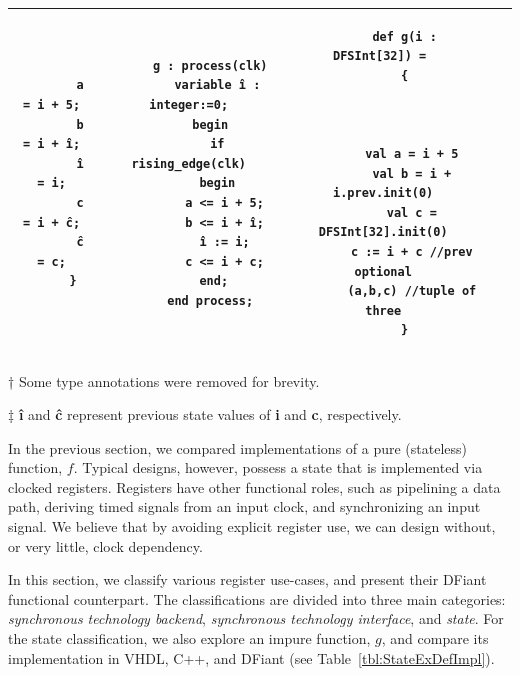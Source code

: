 \begin{table}
\begin{threeparttable}
\begin{tabular}{|c|c|c|c|c|}
\begin{minipage}[b]{0.14\linewidth}
\begin{verbatim}
        a = i + 5;
        b = i + î;
        î = i;
        c = i + ĉ;
        ĉ = c;
      }
		\end{verbatim}
	\end{minipage}
	&
	\begin{minipage}[b]{0.21\linewidth}
		\begin{verbatim}
      g : process(clk)
        variable î : integer:=0;
      begin
        if rising_edge(clk)
        begin
          a <= i + 5;
          b <= i + î;
          î := i;
          c <= i + c;
        end; 
      end process;
			\end{verbatim}
	\end{minipage}
	&
	\begin{minipage}[b]{0.23\linewidth}
		\begin{verbatim}
      def g(i : DFSInt[32]) = 
      {
        
        
        
        val a = i + 5
        val b = i + i.prev.init(0)
        val c = DFSInt[32].init(0)
        c := i + c //prev optional
        (a,b,c) //tuple of three
      }
		\end{verbatim}
	\end{minipage}
  \\
  \hline
  \end{tabular}
  \begin{tablenotes}
    \item [†] Some type annotations were removed for brevity.
    \item [‡] \textbf{î} and \textbf{ĉ} represent previous state values of \textbf{i} and \textbf{c}, respectively.
  \end{tablenotes}
  \end{threeparttable}
\end{table}%

In the previous section, we compared implementations of a pure (stateless) function, $f$. Typical designs, however, possess a state that is implemented via clocked registers. Registers have other functional roles, such as pipelining a data path, deriving timed signals from an input clock, and synchronizing an input signal. We believe that by avoiding explicit register use, we can design without, or very little, clock dependency. 

In this section, we classify various register use-cases, and present their DFiant functional counterpart. The classifications are divided into three main categories: \textit{synchronous technology backend}, \textit{synchronous technology interface}, and \textit{state}. For the state classification, we also explore an impure function, $g$, and compare its implementation in VHDL, C++, and DFiant (see Table~\ref{tbl:StateExDefImpl}).

